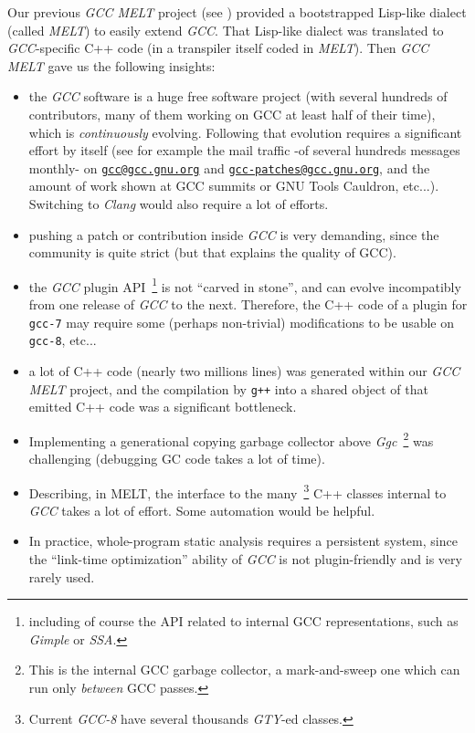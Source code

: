 Our previous \emph{GCC MELT} project (see \cite{Starynkevitch-DSL2011,
  Starynkevitch-GCCMELTweb, Starynkevitch2007Multistage}) provided a
bootstrapped Lisp-like dialect (called \emph{MELT}) to easily extend
\emph{GCC}. That Lisp-like dialect was translated to
\emph{GCC}-specific C++ code (in a transpiler itself coded in
\emph{MELT}). Then \emph{GCC MELT} gave us the following insights:

\begin{itemize}
  \item the \emph{GCC} software is a huge free software project (with
    several hundreds of contributors, many of them working on GCC at
    least half of their time), which is \emph{continuously}
    evolving. Following that evolution requires a significant effort
    by itself (see for example the mail traffic -of several hundreds
    messages monthly- on
    \href{https://gcc.gnu.org/ml/gcc/}{\texttt{gcc@gcc.gnu.org}} and
    \href{https://gcc.gnu.org/ml/gcc-patches/}{\texttt{gcc-patches@gcc.gnu.org}},
    and the amount of work shown at GCC summits or GNU Tools Cauldron,
    etc...). Switching to \emph{Clang} would also require a lot of
    efforts.


  \item pushing a patch or contribution inside \emph{GCC} is very
    demanding, since the community is quite strict (but that explains
    the quality of GCC).

  \item the \emph{GCC} plugin API~\footnote{including of course the
    API related to internal GCC representations, such as \emph{Gimple}
    or \emph{SSA}.} is not ``carved in stone'', and can evolve
    incompatibly from one release of \emph{GCC} to the
    next. Therefore, the C++ code of a plugin for \texttt{gcc-7} may
    require some (perhaps non-trivial) modifications to be usable on
    \texttt{gcc-8}, etc...

  \item a lot of C++ code (nearly two millions lines) was generated
    within our \emph{GCC MELT} project, and the compilation by
    \texttt{g++} into a shared object of that emitted C++ code was a
    significant bottleneck.

  \item Implementing a generational copying garbage collector above
    \emph{Ggc}~\footnote{This is the internal GCC garbage collector, a
      mark-and-sweep one which can run only \emph{between} GCC
      passes.} was challenging (debugging GC code takes a lot of time).

    \item Describing, in MELT, the interface to the
      many~\footnote{Current \emph{GCC-8} have several thousands
        \emph{GTY}-ed classes.} C++ classes internal to \emph{GCC}
      takes a lot of effort. Some automation would be helpful.

   \item In practice, whole-program static analysis requires a
     persistent system, since the ``link-time optimization'' ability
     of \emph{GCC} is not plugin-friendly and is very rarely used.
\end{itemize}

